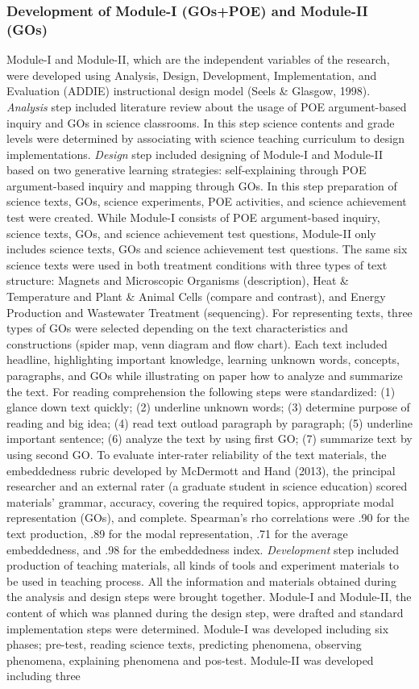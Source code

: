 \documentclass[11.5pt]{sig-alternate} %
\begin{document}
\begin{large}
\subsubsection*{Development of Module-I (GOs+POE) and Module-II (GOs)}
Module-I and Module-II, which are the independent variables of the research, were developed using Analysis, Design, Development, Implementation, and Evaluation (ADDIE) instructional design model (Seels \& Glasgow, 1998). \textit{Analysis} step included literature review about the usage of POE argument-based inquiry and GOs in science classrooms. In this step science contents and grade levels were determined by associating with science teaching curriculum to design implementations. \textit{Design} step included designing of Module-I and Module-II based on two generative learning strategies: self-explaining through POE argument-based inquiry and mapping through GOs. In this step preparation of science texts, GOs, science experiments, POE activities, and science achievement test were created. While Module-I consists of POE argument-based inquiry, science texts, GOs, and science achievement test questions, Module-II only includes science texts, GOs and science achievement test questions. The same six science texts were used in both treatment conditions with three types of text structure: Magnets and Microscopic Organisms (description), Heat \& Temperature and Plant \& Animal Cells (compare and contrast), and Energy Production and Wastewater Treatment (sequencing). For representing texts, three types of GOs were selected depending on the text characteristics and constructions (spider map, venn diagram and flow chart). Each text included headline, highlighting important knowledge, learning unknown words, concepts, paragraphs, and GOs while illustrating on paper how to analyze and summarize the text. For reading comprehension the following steps were standardized: (1) glance down text quickly; (2) underline unknown words; (3) determine purpose of reading and big idea; (4) read text outload paragraph by paragraph; (5) underline important sentence; (6) analyze the text by using first GO; (7) summarize text by using second GO. To evaluate inter-rater reliability of the text materials, the embeddedness rubric developed by McDermott and Hand (2013), the principal researcher and an external rater (a graduate student in science education) scored materials’ grammar, accuracy, covering the required topics, appropriate modal representation (GOs), and complete. Spearman’s rho correlations were .90 for the text production, .89 for the modal representation, .71 for the average embeddedness, and .98 for the embeddedness index. \textit{Development} step included production of teaching materials, all kinds of tools and experiment materials to be used in teaching process. All the information and materials obtained during the analysis and design steps were brought together. Module-I and Module-II, the content of which was planned during the design step, were drafted and standard implementation steps were determined. Module-I was developed including six phases; pre-test, reading science texts, predicting phenomena, observing phenomena, explaining phenomena and pos-test. Module-II was developed including three 
\end{large}
\end{document}
